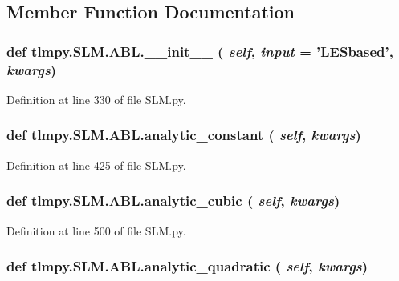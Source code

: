 \subsection{Member Function Documentation}
\hypertarget{classtlmpy_1_1SLM_1_1ABL_a3a6799e28f871a0acfc1adcbf3f47e26}{
\subsubsection[{\_\-\_\-init\_\-\_\-}]{\setlength{\rightskip}{0pt plus 5cm}def tlmpy.SLM.ABL.\_\-\_\-init\_\-\_\- ( {\em self}, \/   {\em input} = {\ttfamily 'LESbased'}, \/   {\em kwargs})}}
\label{classtlmpy_1_1SLM_1_1ABL_a3a6799e28f871a0acfc1adcbf3f47e26}


Definition at line 330 of file SLM.py.\hypertarget{classtlmpy_1_1SLM_1_1ABL_af054609ff5ff944585272a7b42ed7f83}{
\subsubsection[{analytic\_\-constant}]{\setlength{\rightskip}{0pt plus 5cm}def tlmpy.SLM.ABL.analytic\_\-constant ( {\em self}, \/   {\em kwargs})}}
\label{classtlmpy_1_1SLM_1_1ABL_af054609ff5ff944585272a7b42ed7f83}


Definition at line 425 of file SLM.py.\hypertarget{classtlmpy_1_1SLM_1_1ABL_a9d2b072be9668fed2a068258b3d3e2c9}{
\subsubsection[{analytic\_\-cubic}]{\setlength{\rightskip}{0pt plus 5cm}def tlmpy.SLM.ABL.analytic\_\-cubic ( {\em self}, \/   {\em kwargs})}}
\label{classtlmpy_1_1SLM_1_1ABL_a9d2b072be9668fed2a068258b3d3e2c9}


Definition at line 500 of file SLM.py.\hypertarget{classtlmpy_1_1SLM_1_1ABL_aeb53c834998feef39584056aaf825d45}{
\subsubsection[{analytic\_\-quadratic}]{\setlength{\rightskip}{0pt plus 5cm}def tlmpy.SLM.ABL.analytic\_\-quadratic ( {\em self}, \/   {\em kwargs})}}
\label{classtlmpy_1_1SLM_1_1ABL_aeb53c834998feef39584056aaf825d45}


